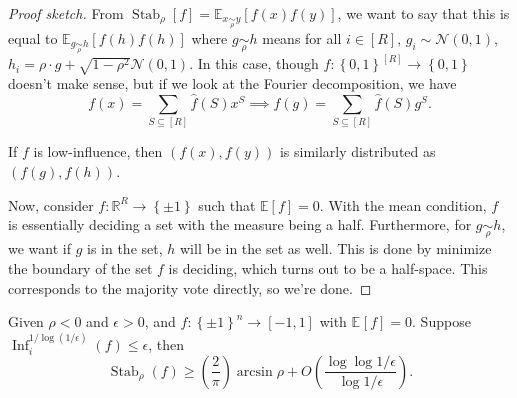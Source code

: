 \begin{proof}[Proof sketch]
	From \(\mathop{\mathrm{Stab}}_\rho [f] = \mathbb{E}_{x \underset{\rho }{\sim } y}\left[f(x) f(y) \right] \), we want to say that this is equal to \(\mathbb{E}_{g \underset{\rho }{\sim } h}\left[ f(h) f(h) \right] \) where \(g \underset{\rho }{\sim } h\) means for all \(i\in [R]\), \(g_i \sim \mathcal{N} (0, 1)\), \(h_i = \rho \cdot g + \sqrt{1 - \rho ^{2} }\mathcal{N} (0, 1) \). In this case, though \(f\colon \left\{ 0, 1 \right\} ^{[R]} \to \left\{ 0, 1 \right\} \) doesn't make sense, but if we look at the Fourier decomposition, we have
	\[
		f(x) = \sum_{S \subseteq [R]} \hat{f} (S) x^S \implies f(g) = \sum_{S \subseteq [R]} \hat{f} (S) g^S.
	\]

	\begin{remark}
		If \(f\) is low-influence, then \((f(x), f(y))\) is similarly distributed as \((f(g), f(h))\).
	\end{remark}
	Now, consider \(f\colon \mathbb{R} ^R \to \left\{ \pm 1 \right\} \) such that \(\mathbb{E}\left[f \right] =0\). With the mean condition, \(f\) is essentially deciding a set with the measure being a half. Furthermore, for \(g \underset{\rho }{\sim } h\), we want if \(g\) is in the set, \(h\) will be in the set as well. This is done by minimize the boundary of the set \(f\) is deciding, which turns out to be a half-space. This corresponds to the majority vote directly, so we're done.
\end{proof}

\begin{corollary}
	Given \(\rho < 0\) and \(\epsilon > 0\), and \(f\colon \left\{ \pm 1 \right\} ^n \to [-1, 1]\) with \(\mathbb{E}_{}\left[f \right] = 0\). Suppose \(\mathop{\mathrm{Inf}}_i^{1 / \log (1 / \epsilon )}(f)\leq \epsilon \), then
	\[
		\mathop{\mathrm{Stab}}\nolimits_\rho (f) \geq \left( \frac{2}{\pi } \right) \arcsin \rho + O\left( \frac{\log \log 1 / \epsilon }{\log 1 / \epsilon } \right).
	\]
\end{corollary}

